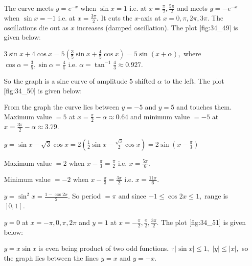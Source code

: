  The curve meets $y = e^{-x}$ when $\sin x = 1$ i.e. at $x = \frac{\pi}{2}, \frac{5\pi}{2}$ and meets $y = -e^{-x}$ when
  $\sin x = -1$ i.e. at $x = \frac{3\pi}{2}.$ It cuts the $x$-axis at $x = 0, \pi, 2\pi, 3\pi.$ The oscillations die out
  as $x$ increases (damped oscillation). The plot [fig:34_49] is given below:

  \startplacefigure[title={Plot of $e^{-x}\sin x$ and $\pm e^{-x}$}, reference=fig:34_49]
    \externalfigure[34_49.pdf]
  \stopplacefigure

\item $3\sin x + 4\cos x = 5\left(\frac{3}{5}\sin x + \frac{4}{5}\cos x\right) = 5\sin(x + \alpha),$ where $\cos\alpha
  = \frac{3}{5}, \sin\alpha = \frac{4}{5}$ i.e. $\alpha = \tan^{-1}\frac{4}{3}\approx 0.927.$

  So the graph is a sine curve of amplitude $5$ shifted $\alpha$ to the left. The plot [fig:34_50] is given
  below:

  \startplacefigure[title={Plot of $3\sin x + 4\cos x$}, reference=fig:34_50]
    \externalfigure[34_50.pdf]
  \stopplacefigure

  From the graph the curve lies between $y = -5$ and $y = 5$ and touches them. Maximum value $= 5$ at $x =
  \frac{\pi}{2} - \alpha\approx 0.64$ and minimum value $= -5$ at $x = \frac{3\pi}{2} - \alpha\approx 3.79.$

\item $y = \sin x - \sqrt{3}\cos x = 2\left(\frac{1}{2}\sin x - \frac{\sqrt{3}}{2}\cos x\right) = 2\sin\left(x -
  \frac{\pi}{3}\right)$

  Maximum value $= 2$ when $x - \frac{\pi}{3} = \frac{\pi}{2}$ i.e. $x = \frac{5\pi}{6}.$

  Minimum value $= -2$ when $x - \frac{\pi}{3} = \frac{3\pi}{2}$ i.e. $x = \frac{11\pi}{6}.$

\item $y = \sin^2x = \frac{1 - \cos2x}{2}.$ So period $= \pi$ and since $-1\leq\cos2x\leq 1,$ range is $[0, 1].$

  $y = 0$ at $x = -\pi, 0, \pi, 2\pi$ and $y = 1$ at $x = -\frac{\pi}{2}, \frac{\pi}{2}, \frac{3\pi}{2}.$ The plot
  [fig:34_51] is given below:

  \startplacefigure[title={Plot of $\sin^2x$}, reference=fig:34_51]
    \externalfigure[34_51.pdf]
  \stopplacefigure

\item $y = x\sin x$ is even being product of two odd functions. $\because |\sin x|\leq 1,$ $|y|\leq|x|,$ so the graph
  lies between the lines $y = x$ and $y = -x.$

